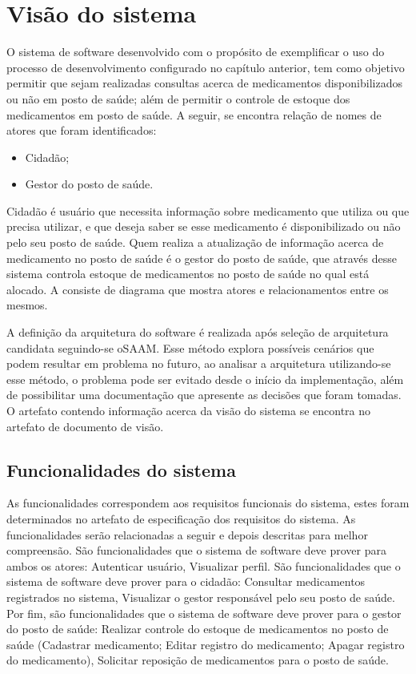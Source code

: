 \section{Visão do sistema}
\label{sec:visão do sistema}

O sistema de software desenvolvido com o propósito de  exemplificar o uso do processo de desenvolvimento configurado no capítulo anterior, tem como objetivo permitir que sejam realizadas consultas acerca de medicamentos disponibilizados ou não em posto de saúde; além de permitir o controle de estoque dos medicamentos em posto de saúde. A seguir, se encontra relação de nomes de atores que foram identificados:

\begin{itemize}
    \item Cidadão;
    \item Gestor do posto de saúde.
\end{itemize}

Cidadão é usuário que necessita informação sobre medicamento que utiliza ou que precisa utilizar, e que deseja saber se esse medicamento é disponibilizado ou não pelo seu posto de saúde. Quem realiza a atualização de informação acerca de medicamento no posto de saúde é o gestor do posto de saúde, que através desse sistema controla estoque de medicamentos no posto de saúde no qual está alocado. A  consiste de diagrama que mostra atores e relacionamentos entre os mesmos.

%

A definição da arquitetura do software é realizada após seleção de arquitetura candidata seguindo-se o\acrfull{SAAM}. Esse método explora possíveis cenários que podem resultar em problema no futuro, ao analisar a arquitetura utilizando-se esse método, o problema pode ser evitado desde o início da implementação, além de possibilitar uma documentação que apresente as decisões que foram tomadas. O artefato contendo informação acerca da visão do sistema se encontra no artefato de documento de visão.

\subsection{Funcionalidades do sistema}

As funcionalidades correspondem aos requisitos funcionais do sistema, estes foram determinados no artefato de especificação dos requisitos do sistema. As funcionalidades serão relacionadas a seguir e depois descritas para melhor compreensão. São funcionalidades que o sistema de software deve prover para ambos os atores: Autenticar usuário, Visualizar perfil. São  funcionalidades que o sistema de software deve prover para o cidadão: Consultar medicamentos registrados no sistema, Visualizar o gestor responsável pelo seu posto de saúde. Por fim, são  funcionalidades que o sistema de software deve prover para o gestor do posto de saúde: Realizar controle do estoque de medicamentos no posto de saúde (Cadastrar medicamento; Editar registro do medicamento; Apagar registro do medicamento), Solicitar reposição de medicamentos para o posto de saúde.

